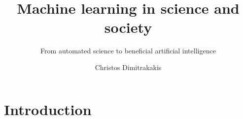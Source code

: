 \documentclass{beamer}
\title{Machine learning in science and society}
\subtitle{From automated science to beneficial artificial intelligence}
\author[C. Dimitrakakis]{Christos Dimitrakakis}
\begin{document}
\begin{frame}
  \titlepage
\end{frame}

\chapter{Introduction}

  

\end{document}
